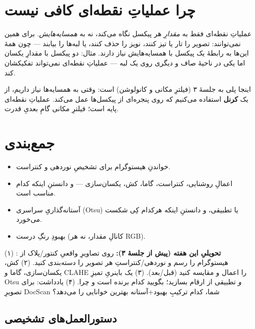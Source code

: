 \documentclass[12pt,a4paper]{article}
\begin{document}
\section{چرا عملیاتِ نقطه‌ای کافی نیست}

عملیاتِ نقطه‌ای فقط به \emph{مقدارِ} هر پیکسل نگاه می‌کند، نه به \emph{همسایه‌هایش}. برای همین
نمی‌توانند: تصویر را تار یا تیز کنند، نویز را حذف کنند، یا لبه‌ها را بیابند — چون همهٔ این‌ها به
رابطهٔ یک پیکسل با همسایه‌هایش نیاز دارند. مثال: دو پیکسل با مقدارِ یکسان اما یکی در ناحیهٔ صاف و
دیگری روی یک لبه — عملیاتِ نقطه‌ای نمی‌تواند تفکیکشان کند.

\begin{yaddasht}
اینجا پلی به جلسهٔ ۳ (فیلترِ مکانی و کانولوشن) است: وقتی به همسایه‌ها نیاز داریم، از یک
\textbf{کرنل} استفاده می‌کنیم که روی پنجره‌ای از پیکسل‌ها عمل می‌کند. عملیاتِ نقطه‌ای پایه است؛
فیلترِ مکانی گامِ بعدیِ قدرت.
\end{yaddasht}

\section{جمع‌بندی}

\begin{itemize}
  \item خواندنِ هیستوگرام برای تشخیصِ نوردهی و کنتراست.
  \item اعمالِ روشنایی، کنتراست، گاما، کش، یکسان‌سازی — و دانستنِ اینکه کدام مناسب است.
  \item آستانه‌گذاریِ سراسری (Otsu) یا تطبیقی، و دانستنِ اینکه هرکدام کِی شکست می‌خورد.
  \item بهبودِ رنگِ درست (کانالِ مقدار، نه هر RGB).
\end{itemize}

\begin{tamrin}
\textbf{تحویلیِ این هفته (پیش از جلسهٔ ۳):} روی تصاویرِ واقعیِ کنتور/پلاک از :
(۱) هیستوگرام را رسم و نوردهی/کنتراستِ هر تصویر را دسته‌بندی کنید. (۲) کش، یکسان‌سازی، گاما و
CLAHE را اعمال و مقایسه کنید (قبل/بعد). (۳) یک باینریِ تمیزِ Otsu \emph{و} تطبیقی از ارقام
بسازید؛ بگویید کدام برنده است و چرا. (۴) یادداشت: برای تصویرِ DocScanِ شما، کدام ترکیبِ
بهبود+آستانه بهترین خوانایی را می‌دهد؟
\end{tamrin}

\subsection*{دستورالعمل‌های تشخیصی}
\end{document}

